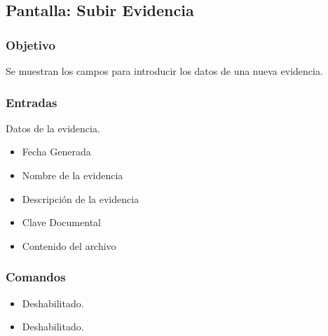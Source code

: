 \subsection{Pantalla: Subir Evidencia}
\subsubsection{Objetivo}
Se muestran los campos para introducir los datos de una nueva evidencia.


\subsubsection{Entradas}
Datos de la evidencia.
\begin{itemize}
\item Fecha Generada
\item Nombre de la evidencia
\item Descripción de la evidencia
\item Clave Documental
\item Contenido del archivo
	
\end{itemize}

\subsubsection{Comandos}
\begin{itemize}
 \item {} Deshabilitado.
\item {} Deshabilitado.

\end{itemize}


